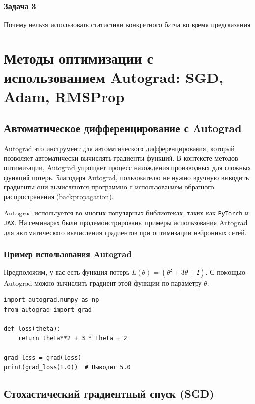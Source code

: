 \subsubsection*{Задача 3}
Почему нельзя использовать статистики конкретного батча во время предсказания


\section{Методы оптимизации с использованием Autograd: SGD, Adam, RMSProp}

\subsection{Автоматическое дифференцирование с Autograd}

Autograd \textendash{} это инструмент для автоматического дифференцирования, который позволяет автоматически вычислять градиенты функций. В контексте методов оптимизации, Autograd упрощает процесс нахождения производных для сложных функций потерь. Благодаря Autograd, пользователю не нужно вручную выводить градиенты \textendash{} они вычисляются программно с использованием обратного распространения (backpropagation).

Autograd используется во многих популярных библиотеках, таких как \texttt{PyTorch} и \texttt{JAX}. На семинарах были продемонстрированы примеры использования Autograd для автоматического вычисления градиентов при оптимизации нейронных сетей.

\subsubsection{Пример использования Autograd}

Предположим, у нас есть функция потерь $L(\theta) = (\theta^2 + 3\theta + 2)$. С помощью Autograd можно вычислить градиент этой функции по параметру $\theta$:

\begin{verbatim}
import autograd.numpy as np
from autograd import grad

def loss(theta):
    return theta**2 + 3 * theta + 2

grad_loss = grad(loss)
print(grad_loss(1.0))  # Выводит 5.0
\end{verbatim}

\subsection{Стохастический градиентный спуск (SGD)}

